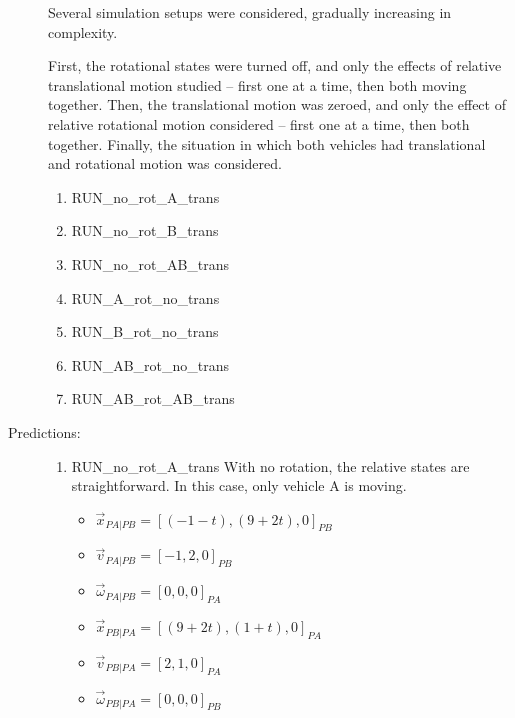 \begin{description}
Several simulation setups were considered, gradually increasing in complexity.

First, the rotational states were turned off, and only the effects of 
relative translational motion studied -- first one at a time, then both moving
together.
Then, the translational motion was zeroed, and only the effect of
relative rotational motion considered -- first one at a time, then both
together.
Finally, the situation in which both vehicles had translational and rotational
motion was considered.

\begin{enumerate}
 \item RUN\_no\_rot\_A\_trans
 \item RUN\_no\_rot\_B\_trans
 \item RUN\_no\_rot\_AB\_trans
 \item RUN\_A\_rot\_no\_trans 
 \item RUN\_B\_rot\_no\_trans
 \item RUN\_AB\_rot\_no\_trans  
 \item RUN\_AB\_rot\_AB\_trans  
\end{enumerate}

\item[Predictions:]



\begin{enumerate}
 \item RUN\_no\_rot\_A\_trans \newline
   With no rotation, the relative states are straightforward.  In this case, only vehicle A is moving.
   \begin{itemize}
    \item $\vec x_{PA|PB} = [(-1 - t), (9 + 2t) , 0]_{PB}$
    \item $\vec v_{PA|PB} = [-1 , 2 , 0]_{PB}$
    \item $\vec \omega_{PA|PB} = [0 , 0 , 0]_{PA}$
    \item $\vec x_{PB|PA} = [(9 + 2t) , (1 + t) , 0]_{PA}$
    \item $\vec v_{PB|PA} = [2 , 1 , 0]_{PA}$
    \item $\vec \omega_{PB|PA} = [0 , 0 , 0]_{PB}$
   \end{itemize}


\end{enumerate}
\end{description}
